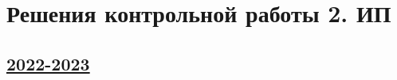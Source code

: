 \thispagestyle{empty}
\section{Решения контрольной работы 2. ИП}


\subsection[2022-2023]{\hyperref[sec:sol_kr_ip_02_2022_2023]{2022-2023}}
\label{sec:sol_kr_02_ip_2022_2023}


